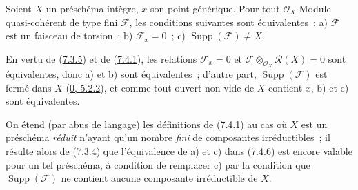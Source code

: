 \begin{proposition}[7.4.6]
\label{I.7.4.6-fr}
Soient $X$ un préschéma intègre, $x$ son point générique. Pour tout
$\mathscr{O}_X$-Module quasi-cohérent de type fini $\mathscr{F}$, les
conditions suivantes sont équivalentes~: a) $\mathscr{F}$ est un faisceau de
torsion~; b) $\mathscr{F}_x=0$~; c)
$\operatorname{Supp}(\mathscr{F})\neq X$.
\end{proposition}

En vertu de (\hyperref[I.7.3.5-fr]{7.3.5}) et de
(\hyperref[I.7.4.1-fr]{7.4.1}), les relations $\mathscr{F}_x=0$ et
$\mathscr{F}\otimes_{\mathscr{O}_X}\mathscr{R}(X)=0$ sont équivalentes, donc
a) et b) sont équivalentes~; d'autre part,
$\operatorname{Supp}(\mathscr{F})$ est fermé dans $X$
(\hyperref[0.5.2.2-fr]{0, 5.2.2}), et comme tout ouvert non vide de $X$
contient $x$, b) et c) sont équivalentes.

\begin{env}[7.4.7]
\label{I.7.4.7-fr}
On étend (par abus de langage) les définitions de
(\hyperref[I.7.4.1-fr]{7.4.1}) au cas où $X$ est un préschéma
\emph{réduit} n'ayant qu'un nombre \emph{fini} de composantes irréductibles~;
il résulte alors de (\hyperref[I.7.3.4-fr]{7.3.4}) que l'équivalence de a) et
c) dans (\hyperref[I.7.4.6-fr]{7.4.6}) est encore valable pour un tel
préschéma, à condition de remplacer c) par la condition que
$\operatorname{Supp}(\mathscr{F})$ ne contient aucune composante irréductible de $X$.
\end{env}
